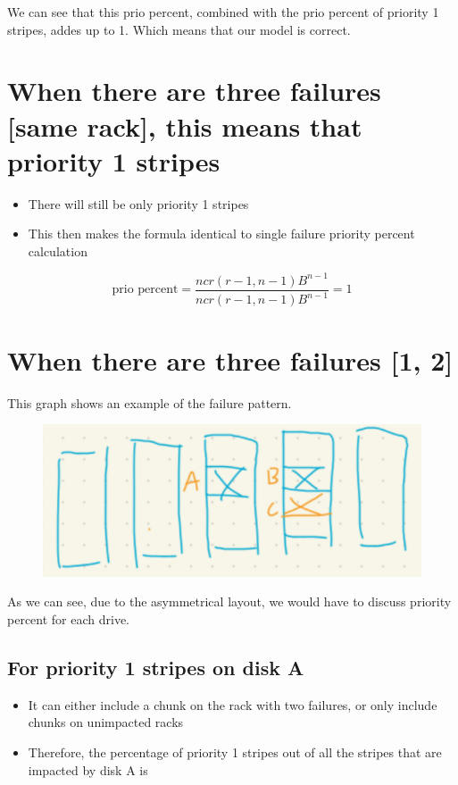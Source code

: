 \documentclass[journal]{IEEEtran}
\begin{document}
We can see that this prio percent, combined with the prio percent of priority 1 stripes, addes up to 1. Which means that our model is correct.

\section{When there are three failures [same rack], this means that \textbf{priority 1 stripes}}
\begin{itemize}
  \item There will still be only priority 1 stripes
  \item This then makes the formula identical to single failure priority percent calculation
\end{itemize}

\begin{equation*}
  \text{prio percent}=\frac{ncr(r-1, n-1)B^{n-1}}{ncr(r-1, n-1)B^{n-1}}=1
\end{equation*}

\section{When there are three failures [1, 2]}

This graph shows an example of the failure pattern.
\begin{figure}[H]
  \includegraphics{img/3-1-2.png}
  \centering
\end{figure}
As we can see, due to the asymmetrical layout, we would have to discuss priority percent for each drive.

\subsection*{For priority 1 stripes on disk A}

\begin{itemize}
  \item It can either include a chunk on the rack with two failures, or only include chunks on unimpacted racks
  \item Therefore, the percentage of priority 1 stripes out of all the stripes that are impacted by disk A is
\end{itemize}
\end{document}
